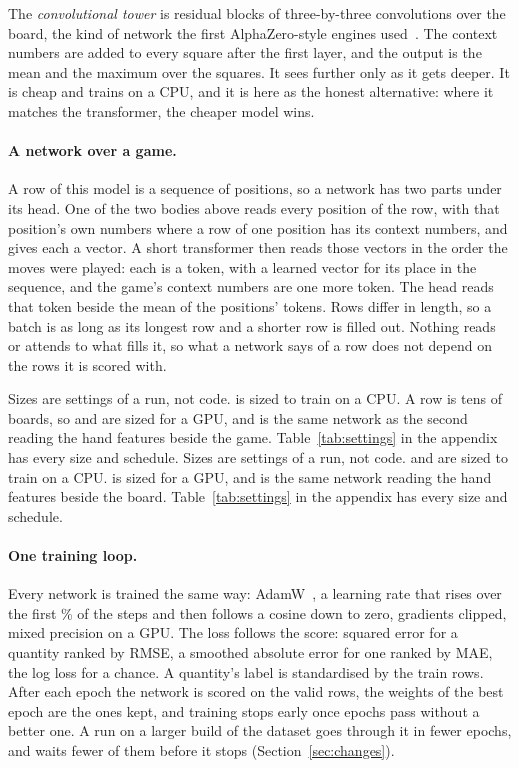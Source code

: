 The \emph{convolutional tower} is residual blocks of three-by-three
convolutions over the board, the kind of network the first AlphaZero-style
engines used~\cite{alphazero}. The context numbers are added to every square
after the first layer, and the output is the mean and the maximum over the
squares. It sees further only as it gets deeper. It is cheap and trains on a
CPU, and it is here as the honest alternative: where it matches the
transformer, the cheaper model wins.

\ifsequence
\paragraph{A network over a game.}
A row of this model is a sequence of positions, so a network has two parts
under its head. One of the two bodies above reads every position of the row,
with that position's own numbers where a row of one position has its context
numbers, and gives each a vector. A short transformer then reads those
vectors in the order the moves were played: each is a token, with a learned
vector for its place in the sequence, and the game's context numbers are one
more token. The head reads that token beside the mean of the positions'
tokens. Rows differ in length, so a batch is as long as its longest row and
a shorter row is filled out. Nothing reads or attends to what fills it, so
what a network says of a row does not depend on the rows it is scored with.

Sizes are settings of a run, not code.  is sized to train on
a CPU. A row is tens of boards, so  and
 are sized for a GPU, and
 is the same network as the second reading the
hand features beside the game. Table~\ref{tab:settings} in the appendix has
every size and schedule.
\else
Sizes are settings of a run, not code.  and
 are sized to train on a CPU. 
is sized for a GPU, and  is the same network
reading the hand features beside the board. Table~\ref{tab:settings} in the
appendix has every size and schedule.
\fi

\paragraph{One training loop.}
Every network is trained the same way: AdamW~\cite{adamw}, a learning rate
that rises over the first \% of the steps and then
follows a cosine down to zero, gradients clipped, mixed precision on a GPU.
The loss follows the score: squared error for a quantity ranked by RMSE, a
smoothed absolute error for one ranked by MAE, the log loss for a chance. A
quantity's label is standardised by the train rows. After each epoch the
network is scored on the valid rows, the weights of the best epoch are the
ones kept, and training stops early once  epochs pass
without a better one.
\ifmore
A run on a larger build of the dataset goes through it in fewer epochs, and
waits fewer of them before it stops (Section~\ref{sec:changes}).
\fi

\begin{table}[htbp]\centering\footnotesize
{}
\caption{The runs, best first. \emph{Kept} is what the valid rows chose: the
number of trees, or the epoch whose weights were kept. \emph{Time} is the
whole run, training and scoring.}
\label{tab:runs}
\end{table}
